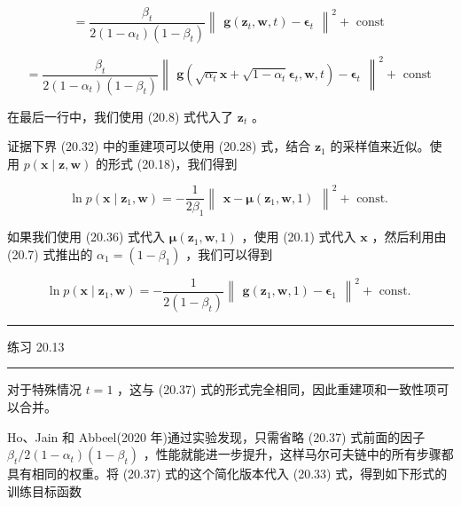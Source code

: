 \documentclass[10pt]{report}
\newcommand{\HRule}{\begin{center}\rule{0.9\linewidth}{0.2mm}\end{center}}
\begin{document}
\[
= \frac{{\beta }_{t}}{2\left( {1 - {\alpha }_{t}}\right) \left( {1 - {\beta }_{t}}\right) }{\begin{Vmatrix}\mathbf{g}\left( {\mathbf{z}}_{t},\mathbf{w},t\right)  - {\mathbf{\epsilon }}_{t}\end{Vmatrix}}^{2} + \text{ const }
\]

\[
= \frac{{\beta }_{t}}{2\left( {1 - {\alpha }_{t}}\right) \left( {1 - {\beta }_{t}}\right) }{\begin{Vmatrix}\mathbf{g}\left( \sqrt{{\alpha }_{t}}\mathbf{x} + \sqrt{1 - {\alpha }_{t}}{\mathbf{\epsilon }}_{t},\mathbf{w},t\right)  - {\mathbf{\epsilon }}_{t}\end{Vmatrix}}^{2} + \text{ const } \tag{20.37}
\]

在最后一行中，我们使用 (20.8) 式代入了 \({\mathbf{z}}_{t}\) 。

证据下界 (20.32) 中的重建项可以使用 (20.28) 式，结合 \({\mathbf{z}}_{1}\) 的采样值来近似。使用 \(p\left( {\mathbf{x} \mid  \mathbf{z},\mathbf{w}}\right)\) 的形式 (20.18)，我们得到

\[
\ln p\left( {\mathbf{x} \mid  {\mathbf{z}}_{1},\mathbf{w}}\right)  =  - \frac{1}{2{\beta }_{1}}{\begin{Vmatrix}\mathbf{x} - \mathbf{\mu }\left( {\mathbf{z}}_{1},\mathbf{w},1\right) \end{Vmatrix}}^{2} + \text{ const. } \tag{20.38}
\]

如果我们使用 (20.36) 式代入 \(\mathbf{\mu }\left( {{\mathbf{z}}_{1},\mathbf{w},1}\right)\) ，使用 (20.1) 式代入 \(\mathbf{x}\) ，然后利用由 (20.7) 式推出的 \({\alpha }_{1} = \left( {1 - {\beta }_{1}}\right)\) ，我们可以得到

\[
\ln p\left( {\mathbf{x} \mid  {\mathbf{z}}_{1},\mathbf{w}}\right)  =  - \frac{1}{2\left( {1 - {\beta }_{t}}\right) }{\begin{Vmatrix}\mathbf{g}\left( {\mathbf{z}}_{1},\mathbf{w},1\right)  - {\mathbf{\epsilon }}_{1}\end{Vmatrix}}^{2} + \text{ const. } \tag{20.39}
\]

\HRule

练习 20.13

\HRule

对于特殊情况 \(t = 1\) ，这与 (20.37) 式的形式完全相同，因此重建项和一致性项可以合并。

Ho、Jain 和 Abbeel(2020 年)通过实验发现，只需省略 (20.37) 式前面的因子 \({\beta }_{t}/2\left( {1 - {\alpha }_{t}}\right) \left( {1 - {\beta }_{t}}\right)\) ，性能就能进一步提升，这样马尔可夫链中的所有步骤都具有相同的权重。将 (20.37) 式的这个简化版本代入 (20.33) 式，得到如下形式的训练目标函数
\end{document}
